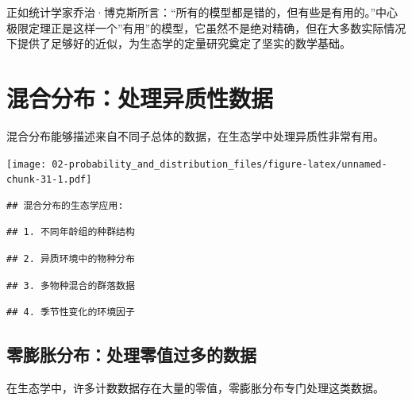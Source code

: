 \documentclass[
  twoside]{book}
\begin{document}
正如统计学家乔治·博克斯所言：``所有的模型都是错的，但有些是有用的。''中心极限定理正是这样一个''有用''的模型，它虽然不是绝对精确，但在大多数实际情况下提供了足够好的近似，为生态学的定量研究奠定了坚实的数学基础。

\hypertarget{ux6df7ux5408ux5206ux5e03ux5904ux7406ux5f02ux8d28ux6027ux6570ux636e}{%
\section{混合分布：处理异质性数据}\label{ux6df7ux5408ux5206ux5e03ux5904ux7406ux5f02ux8d28ux6027ux6570ux636e}}

混合分布能够描述来自不同子总体的数据，在生态学中处理异质性非常有用。

\texttt{[image: 02-probability\_and\_distribution\_files/figure-latex/unnamed-chunk-31-1.pdf]}

\begin{verbatim}
## 混合分布的生态学应用:
\end{verbatim}

\begin{verbatim}
## 1. 不同年龄组的种群结构
\end{verbatim}

\begin{verbatim}
## 2. 异质环境中的物种分布
\end{verbatim}

\begin{verbatim}
## 3. 多物种混合的群落数据
\end{verbatim}

\begin{verbatim}
## 4. 季节性变化的环境因子
\end{verbatim}

\hypertarget{ux96f6ux81a8ux80c0ux5206ux5e03ux5904ux7406ux96f6ux503cux8fc7ux591aux7684ux6570ux636e}{%
\subsection{零膨胀分布：处理零值过多的数据}\label{ux96f6ux81a8ux80c0ux5206ux5e03ux5904ux7406ux96f6ux503cux8fc7ux591aux7684ux6570ux636e}}

在生态学中，许多计数数据存在大量的零值，零膨胀分布专门处理这类数据。
\end{document}
